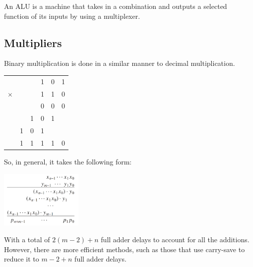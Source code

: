 \documentclass[nobib]{tufte-handout}
\begin{document}
    An ALU is a machine that takes in a combination and outputs a selected function
    of its inputs by using a multiplexer.\\
    \subsection{Multipliers}
    Binary multiplication is done in a similar manner to decimal multiplication.\\
    \begin{table}
        \centering
        \begin{tabular}{c c c c c c}
                     &   &   & 1 & 0 & 1 \\
            $\times$ &   &   & 1 & 1 & 0 \\
            \hline
                     &   &   & 0 & 0 & 0 \\
                     &   & 1 & 0 & 1 &   \\
                     & 1 & 0 & 1 &   &   \\
            \hline
                     & 1 & 1 & 1 & 1 & 0 \\
        \end{tabular}
    \end{table}
    So, in general, it takes the following form:\\
    \begin{center}
        \includegraphics[width = 150px]{images/multiplier.png}
    \end{center}
    With a total of $2(m-2)+n$ full adder delays to account for all the additions. However, there are more efficient methods, such as those that use carry-save to reduce it to $m-2+n$ full adder delays.\\
\end{document}
